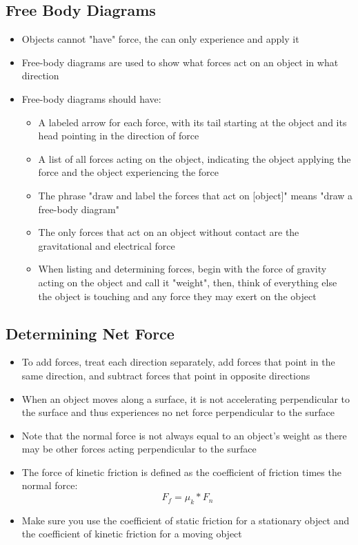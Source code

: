 \subsection{Free Body Diagrams}
\begin{itemize}
    \item Objects cannot "have" force, the can only experience and apply it
    \item Free-body diagrams are used to show what forces act on an object in what direction
    \item Free-body diagrams should have:
    \begin{itemize}
        \item A labeled arrow for each force, with its tail starting at the object and its head pointing in the direction of force
        \item A list of all forces acting on the object, indicating the object applying the force and the object experiencing the force
        \item The phrase "draw and label the forces that act on [object]" means "draw a free-body diagram"
        \item The only forces that act on an object without contact are the gravitational and electrical force
        \item When listing and determining forces, begin with the force of gravity acting on the object and call it "weight", then, think of everything else the object is touching and any force they may exert on the object
    \end{itemize}
\end{itemize}

\subsection{Determining Net Force}
\begin{itemize}
    \item To add forces, treat each direction separately, add forces that point in the same direction, and subtract forces that point in opposite directions
    \item When an object moves along a surface, it is not accelerating perpendicular to the surface and thus experiences no net force perpendicular to the surface
    \item Note that the normal force is not always equal to an object's weight as there may be other forces acting perpendicular to the surface
    \item The force of kinetic friction is defined as the coefficient of friction times the normal force: \[F_f=\mu_k*F_n\]
    \item Make sure you use the coefficient of static friction for a stationary object and the coefficient of kinetic friction for a moving object
\end{itemize}

